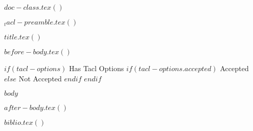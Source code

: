 
%

$doc-class.tex()$


\usepackage{times,latexsym}
\usepackage{url}
\usepackage[T1]{fontenc}

$_tacl-preamble.tex()$


$title.tex()$



$before-body.tex()$

$if(tacl-options)$
Has Tacl Options
$if(tacl-options.accepted)$
Accepted
$else$
Not Accepted
$endif$
$endif$

$body$



$after-body.tex()$

$biblio.tex()$






  




